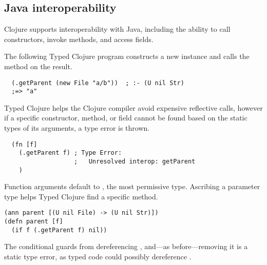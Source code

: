 \subsection{Java interoperability}
\label{sec:overviewjavainterop}

Clojure supports interoperability with Java, including the ability to
call constructors, invoke methods, and access fields.

The following Typed Clojure program constructs a new 
instance and calls the  method on the result.

\begin{exmp}
\begin{verbatim}
  (.getParent (new File "a/b"))  ; :- (U nil Str)
  ;=> "a"
\end{verbatim}
\label{example:getparent-direct-constructor}
\end{exmp}

Typed Clojure helps the Clojure compiler avoid expensive reflective 
calls,
however if a specific constructor, method, or field cannot be found based on the
static types of its arguments, a type error is thrown.

\begin{verbatim}
  (fn [f] 
    (.getParent f) ; Type Error:
                   ;   Unresolved interop: getParent
    )
\end{verbatim}

Function arguments default to , the most permissive type. Ascribing
a parameter type helps Typed Clojure find a specific method.


\begin{exmp}
\begin{verbatim}
(ann parent [(U nil File) -> (U nil Str)])
(defn parent [f]
  (if f (.getParent f) nil))
\end{verbatim}
\label{example:parent-if}
\end{exmp}


The conditional guards from dereferencing , and---as before---removing 
it is a static type error, as typed code could possibly dereference .

